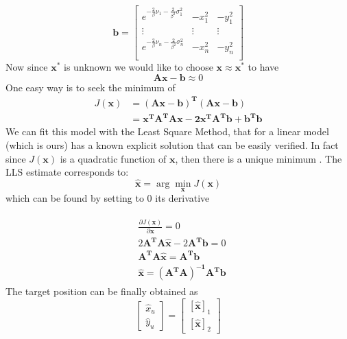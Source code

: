 \documentclass[12pt,twoside]{report}
\begin{document}
$$\mathbf{b}=    \begin{bmatrix}
        e^{-\frac{2}{\beta}\nu_1-\frac{2}{\beta^2}\sigma^2_1} & -x_1^2 & -y_1^2\\
        \vdots&\vdots&\vdots\\
        e^{-\frac{2}{\beta}\nu_n-\frac{2}{\beta^2}\sigma^2_n} & -x_n^2 & -y_n^2\\
    \end{bmatrix}$$
Now since $\mathbf{x^*}$ is unknown we would like to choose $\mathbf{x}\approx\mathbf{x^*}$ to have 
\begin{equation}
    \mathbf{Ax-b}\approx0
\end{equation}
One easy way is to seek the minimum of 
\begin{align}
    J(\mathbf{x})&=\mathbf{(Ax-b)^T(Ax - b)}\\
    &=\mathbf{x^TA^TAx-2x^TA^Tb+b^Tb}
\end{align}
We can fit this model with the Least Square Method, that for a linear model (which is ours) has a known explicit solution \cite{10.5555/1557273} that can be easily verified. In fact since $J(\mathbf{x})$ is a quadratic function of $\mathbf{x}$, then there is a unique minimum \cite{Ortega1987,rzk}. The LLS estimate corresponds to:
\begin{equation}
    \hat{\mathbf{x}}=\arg \min_\mathbf{x} J(\mathbf{x})
\end{equation}
which can be found by setting to $0$ its derivative
    
\begin{align}
\begin{split}
&\frac{\partial J(\mathbf{x})}{\partial \mathbf{x}}=0\\
    &2\mathbf{A^TA}\hat{\mathbf{x}}-2\mathbf{A^Tb}=0\\
    &\mathbf{A^TA\hat{x}}=\mathbf{A^Tb}\\
    &\hat{\mathbf{x}}=\mathbf{(A^TA)^{-1}A^Tb}
\end{split}
\end{align}
The target position can be finally obtained as 
\begin{equation}
\begin{bmatrix}
    \hat{x}_u\\
    \hat{y}_u
\end{bmatrix}=
\begin{bmatrix}
    [\hat{\mathbf{x}}]_1\\
    [\hat{\mathbf{x}}]_2
\end{bmatrix}
\end{equation}
\clearpage
\end{document}
